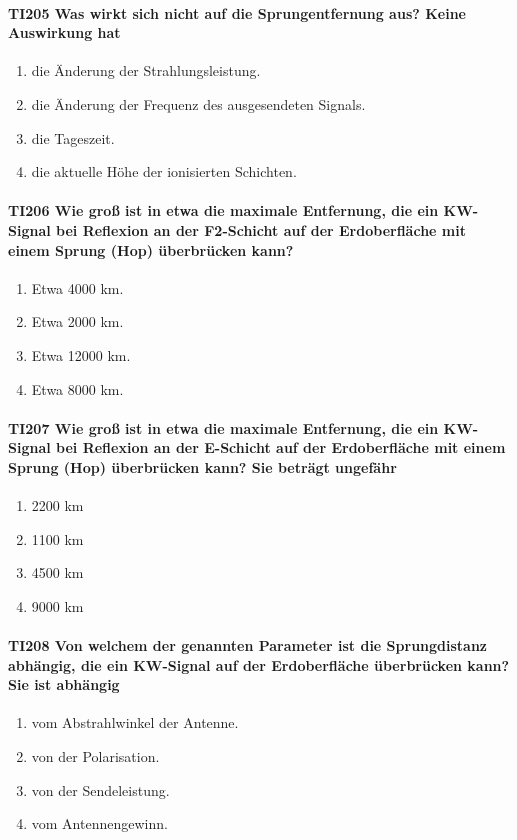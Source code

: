 \documentclass[8pt]{article}
\begin{document}
\paragraph*{TI205 Was wirkt sich nicht auf die Sprungentfernung aus? Keine Auswirkung hat} 
\begin{enumerate}[nolistsep,label=\Alph*]
\item die Änderung der Strahlungsleistung.
\item die Änderung der Frequenz des ausgesendeten Signals.
\item die Tageszeit.
\item die aktuelle Höhe der ionisierten Schichten.
\end{enumerate}

\paragraph*{TI206 Wie groß ist in etwa die maximale Entfernung, die ein KW-Signal bei Reflexion an der F2-Schicht auf der Erdoberfläche mit einem Sprung (Hop) überbrücken kann?}
\begin{enumerate}[nolistsep,label=\Alph*]
\item Etwa 4000 km.
\item Etwa 2000 km.
\item Etwa 12000 km.
\item Etwa 8000 km.
\end{enumerate}

\paragraph*{TI207 Wie groß ist in etwa die maximale Entfernung, die ein KW-Signal bei Reflexion an der E-Schicht auf der Erdoberfläche mit einem Sprung (Hop) überbrücken kann? Sie beträgt ungefähr}
\begin{enumerate}[nolistsep,label=\Alph*]
\item 2200 km
\item 1100 km
\item 4500 km
\item 9000 km
\end{enumerate}

\paragraph*{TI208 Von welchem der genannten Parameter ist die Sprungdistanz abhängig, die ein KW-Signal auf der Erdoberfläche überbrücken kann? Sie ist abhängig} 
\begin{enumerate}[nolistsep,label=\Alph*]
\item vom Abstrahlwinkel der Antenne.
\item von der Polarisation.
\item von der Sendeleistung.
\item vom Antennengewinn.
\end{enumerate}
\end{document}
